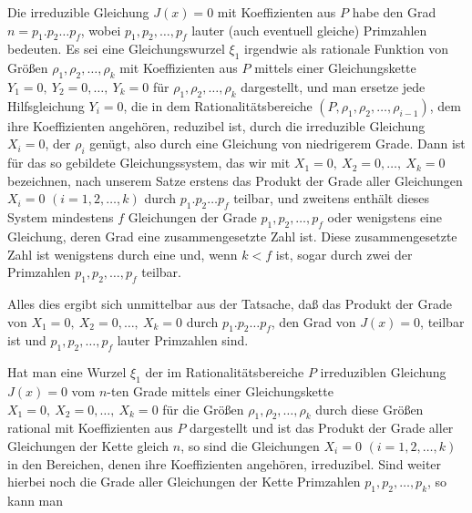 \par\noindent\hspace*{\parindent} Die irreduzible Gleichung \(J(x)=0\) mit Koeffizienten aus \(P\) habe den Grad \(n=p_1\mathord{.}p_2\ldots p_f\), wobei \(p_1,p_2,\ldots,p_f\) lauter (auch eventuell gleiche) Primzahlen bedeuten. Es sei eine Gleichungswurzel \(\xi_1\) irgendwie als rationale Funktion von Größen \(\rho_1,\rho_2,\ldots,\rho_k\) mit Koeffizienten aus \(P\) mittels einer Gleichungskette \(Y_1=0,\ Y_2=0,\ldots,\ Y_k=0\) für \(\rho_1,\rho_2,\ldots,\rho_k\) dargestellt, und man ersetze jede Hilfsgleichung \(Y_i=0\), die in dem Rationalitätsbereiche \((P,\rho_1,\rho_2,\ldots,\rho_{i-1})\), dem ihre Koeffizienten angehören, reduzibel ist, durch die irreduzible Gleichung \(X_i=0\), der \(\rho_i\) genügt, also durch eine Gleichung von niedrigerem Grade. Dann ist für das so gebildete Gleichungssystem, das wir mit \(X_1=0,\ X_2=0,\ldots,\ X_k=0\) bezeichnen, nach unserem Satze erstens das Produkt der Grade aller Gleichungen \(X_i=0\) \((i=1,2,\ldots,k)\) durch \(p_1\mathord{.}p_2\ldots p_f\) teilbar, und zweitens enthält dieses System mindestens \(f\) Gleichungen der Grade \(p_1,p_2,\ldots,p_f\) oder wenigstens eine Gleichung, deren Grad eine zusammengesetzte Zahl ist. Diese zusammengesetzte Zahl ist wenigstens durch eine und, wenn \(k<f\) ist, sogar durch zwei der Primzahlen \(p_1,p_2,\ldots,p_f\) teilbar.
\par\noindent\hspace*{\parindent}Alles dies ergibt sich unmittelbar aus der Tatsache, daß das Produkt der Grade von \(X_1=0,\ X_2=0,\ldots,\ X_k=0\) durch \(p_1\mathord{.}p_2\ldots p_f\), den Grad von \(J(x)=0\), teilbar ist und \(p_1,p_2,\ldots,p_f\) lauter Primzahlen sind.
\par\noindent\hspace*{\parindent} Hat man eine Wurzel \(\xi_1\) der im Rationalitätsbereiche \(P\) irreduziblen Gleichung \(J(x)=0\) vom \(n\)-ten Grade mittels einer Gleichungskette \(X_1=0,\ X_2=0,\ldots,\ X_k=0\) für die Größen \(\rho_1,\rho_2,\ldots,\rho_k\) durch diese Größen rational mit Koeffizienten aus \(P\) dargestellt und ist das Produkt der Grade aller Gleichungen der Kette gleich \(n\), so sind die Gleichungen \(X_i=0\) \((i=1,2,\ldots,k)\) in den Bereichen, denen ihre Koeffizienten angehören, irreduzibel. Sind weiter hierbei noch die Grade aller Gleichungen der Kette Primzahlen \(p_1,p_2,\ldots,p_k\), so kann man 
